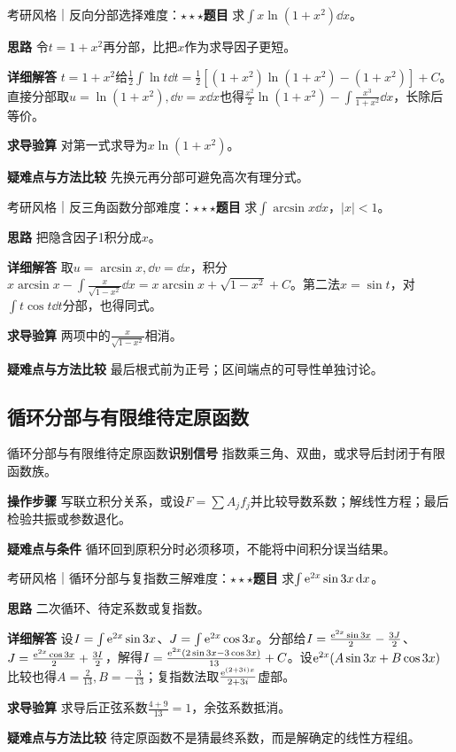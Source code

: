 \begin{example}{考研风格｜反向分部选择}{难度：$\star\star\star$}\label{ic:ex:indefinite_classical_complete:logsec}\textbf{题目} 求$\int x\ln(1+x^2)\dd x$。\par \textbf{思路} 令$t=1+x^2$再分部，比把$x$作为求导因子更短。\par \textbf{详细解答} $t=1+x^2$给$\frac12\int\ln t\dd t=\frac12[(1+x^2)\ln(1+x^2)-(1+x^2)]+C$。直接分部取$u=\ln(1+x^2),\dd v=x\dd x$也得$\frac{x^2}2\ln(1+x^2)-\int \frac{x^3}{1+x^2}\dd x$，长除后等价。\par \textbf{求导验算} 对第一式求导为$x\ln(1+x^2)$。\par \textbf{疑难点与方法比较} 先换元再分部可避免高次有理分式。\end{example}

\begin{example}{考研风格｜反三角函数分部}{难度：$\star\star\star$}\label{ic:ex:indefinite_classical_complete:arcsin}\textbf{题目} 求$\int\arcsin x\dd x$，$|x|<1$。\par \textbf{思路} 把隐含因子1积分成$x$。\par \textbf{详细解答} 取$u=\arcsin x,\dd v=\dd x$，积分$x\arcsin x-\int \frac{x}{\sqrt{1-x^2}}\dd x=x\arcsin x+\sqrt{1-x^2}+C$。第二法$x=\sin t$，对$\int t\cos t\dd t$分部，也得同式。\par \textbf{求导验算} 两项中的$\frac{x}{\sqrt{1-x^2}}$相消。\par \textbf{疑难点与方法比较} 最后根式前为正号；区间端点的可导性单独讨论。\end{example}

\subsection{循环分部与有限维待定原函数}\label{ic:indefinite_classical_complete:cyclic}\begin{method}{循环分部与有限维待定原函数}\textbf{识别信号} 指数乘三角、双曲，或求导后封闭于有限函数族。\par \textbf{操作步骤} 写联立积分关系，或设$F=\sum A_jf_j$并比较导数系数；解线性方程；最后检验共振或参数退化。\par \textbf{疑难点与条件} 循环回到原积分时必须移项，不能将中间积分误当结果。\end{method}

\begin{example}{考研风格｜循环分部与复指数三解}{难度：$\star\star\star$}\label{ic:ex:indefinite_classical_complete:expcycle}\textbf{题目} 求$\int\mathrm{e}^{2x}\sin3x\mathop{}\!\mathrm{d} x$。\par \textbf{思路} 二次循环、待定系数或复指数。\par \textbf{详细解答} 设$I=\int\mathrm{e}^{2x}\sin3x$、$J=\int\mathrm{e}^{2x}\cos3x$。分部给$I=\frac{\mathrm{e}^{2x}\sin3x}{2}-\frac{3J}{2}$、$J=\frac{\mathrm{e}^{2x}\cos3x}{2}+\frac{3I}{2}$，解得$I=\frac{\mathrm{e}^{2x}(2\sin3x-3\cos3x)}{13}+C$。设$\mathrm{e}^{2x}(A\sin3x+B\cos3x)$比较也得$A=\frac{2}{13},B=-\frac{3}{13}$；复指数法取$\frac{\mathrm{e}^{(2+3i)x}}{2+3i}$虚部。\par \textbf{求导验算} 求导后正弦系数$\frac{4+9}{13}=1$，余弦系数抵消。\par \textbf{疑难点与方法比较} 待定原函数不是猜最终系数，而是解确定的线性方程组。\end{example}

